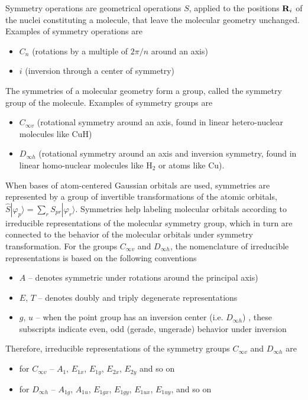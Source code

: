 \documentclass{article}
\begin{document}
Symmetry operations are geometrical operations $S$, applied to the positions ${\bf{R}}_i$ of the nuclei constituting a molecule, that leave the molecular geometry unchanged.
Examples of symmetry operations are 
\begin{itemize}
\item $C_n$ (rotations by a multiple of $2\pi/n$ around an axis) 
\item $i$ (inversion through a center of symmetry)
\end{itemize}
The symmetries of a molecular geometry form a group, called the symmetry group of the molecule.
Examples of symmetry groups are 
\begin{itemize}
\item $C_{\infty v}$  (rotational symmetry around an axis, found in linear hetero-nuclear molecules like CuH) 
\item $D_{\infty h}$ (rotational symmetry around an axis and inversion symmetry, found in linear homo-nuclear molecules like H$_2$ or atoms like Cu).
\end{itemize}
When bases of atom-centered Gaussian orbitals are used, symmetries are represented by a group of invertible transformations of the atomic orbitals, $\hat{S} | \varphi_p \rangle = \sum_r S_{pr} | \varphi_r \rangle$.
Symmetries help labeling molecular orbitals according to irreducible representations of the molecular symmetry group, which in turn are connected
to the behavior of the molecular orbitals under symmetry transformation. 
For the groups $C_{\infty v}$ and $D_{\infty h}$, the nomenclature of irreducible representations is based on the following conventions
\begin{itemize}
\item $A$ -- denotes symmetric under rotations around the principal axis)
\item $E$, $T$ -- denotes doubly and triply degenerate representations
\item $g$, $u$ -- when the point group has an inversion center (i.e. $D_{\infty h}$) , these subscripts indicate even, odd (gerade, ungerade) behavior under inversion
\end{itemize}
Therefore, irreducible representations of the symmetry groups $C_{\infty v}$ and $D_{\infty h}$ are
\begin{itemize}
\item for $C_{\infty v}$ -- $A_1$, $E_{1x}$, $E_{1y}$, $E_{2x}$, $E_{2y}$ and so on
\item for $D_{\infty h}$ -- $A_{1g}$, $A_{1u}$, $E_{1gx}$, $E_{1gy}$, $E_{1ux}$, $E_{1uy}$, and so on
\end{itemize}
\end{document}
